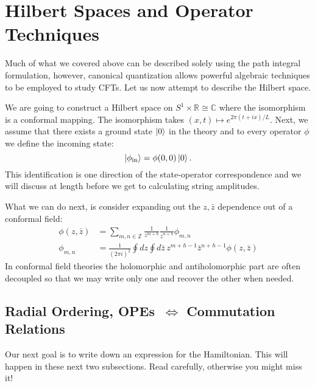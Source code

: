 \documentclass{report}
\theoremstyle{plain}
\theoremstyle{definition}
\theoremstyle{remark}
\newcommand{\FR}[2]{\frac{#1}{#2}}
\newcommand{\bC}{\mathbb{C}}
\newcommand{\bR}{\mathbb{R}}
\newcommand{\bZ}{\mathbb{Z}}
\begin{document}
\section{Hilbert Spaces and Operator Techniques}

Much of what we covered above can be described solely using the path
integral formulation, however, canonical quantization allows powerful
algebraic techniques to be employed to study CFTs. Let us now attempt to
describe the Hilbert space.

We are going to construct a Hilbert space on $S^1\times\bR \cong \bC$ where
the isomorphism is a conformal mapping. The isomorphism takes $(x,t)
\mapsto e^{2\pi(t+ix)/L}$. Next, we assume that there exists a ground state
$\ket 0$ in the theory and to every operator $\phi$ we define the incoming
state: \[\ket{\phi_{\text{in}}} = \phi(0,0)\ket 0.\] This identification is
one direction of the state-operator correspondence and we will discuss at
length before we get to calculating string amplitudes.

What we can do next, is consider expanding out the $z,\bar z$ dependence
out of a conformal field:
\begin{align*}
\phi(z,\bar z) &=\sum_{m,n\in\bZ}\FR{1}{z^{m+h}}\FR{1}{\bar z^{n+h}}\phi_{m,n}\\
\phi_{m,n} &= \FR{1}{(2\pi i)^2} \oint dz \oint d\bar z\, z^{m+h-1} \bar
z^{n+h-1} \phi(z,\bar z)
\end{align*}
In conformal field theories the holomorphic and antiholomorphic part are
often decoupled so that we may write only one and recover the other when
needed.

\subsection{Radial Ordering, OPEs \,$\Leftrightarrow$ Commutation Relations}
Our next goal is to write down an expression for the Hamiltonian. This will
happen in these next two subsections. Read carefully, otherwise you might
miss it!
\end{document}
